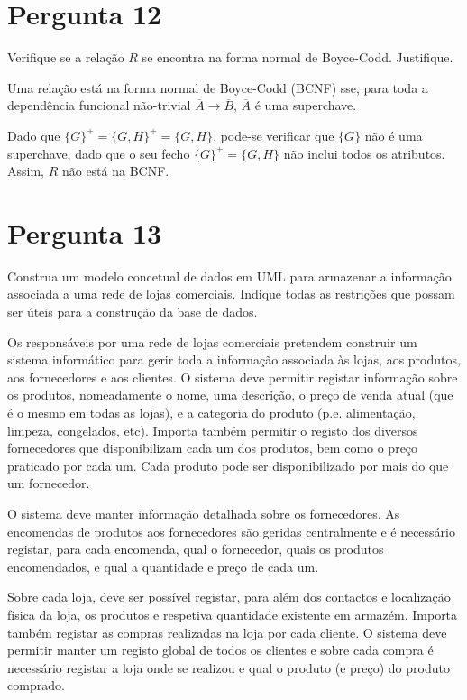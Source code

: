\documentclass[type=normal, year=2015/16]{bdad_exam}
\begin{document}
{\section{Pergunta 12}
Verifique se a relação $R$ se encontra na forma normal de Boyce-Codd. Justifique.

\ansseparator

Uma relação está na forma normal de Boyce-Codd (BCNF) sse, para toda a dependência funcional não-trivial $\overline{A} \rightarrow \overline{B}$, $\overline{A}$ é uma superchave.

Dado que $\{G\}^+=\{G,H\}^+=\{G,H\}$, pode-se verificar que $\{G\}$ não é uma superchave, dado que o seu fecho $\{G\}^+=\{G,H\}$ não inclui todos os atributos. Assim, $R$ não está na BCNF.

\section{Pergunta 13}
Construa um modelo concetual de dados em UML para armazenar a informação associada a uma rede de lojas comerciais. Indique todas as restrições que possam ser úteis para a construção da base de dados.

Os responsáveis por uma rede de lojas comerciais pretendem construir um sistema informático para gerir toda a informação associada às lojas, aos produtos, aos fornecedores e aos clientes. O sistema deve permitir registar informação sobre os produtos, nomeadamente o nome, uma descrição, o preço de venda atual (que é o mesmo em todas as lojas), e a categoria do produto (p.e. alimentação, limpeza, congelados, etc). Importa também permitir o registo dos diversos fornecedores que disponibilizam cada um dos produtos, bem como o preço praticado por cada um. Cada produto pode ser disponibilizado por mais do que um fornecedor.

O sistema deve manter informação detalhada sobre os fornecedores. As encomendas de produtos aos fornecedores são geridas centralmente e é necessário registar, para cada encomenda, qual o fornecedor, quais os produtos encomendados, e qual a quantidade e preço de cada um.

Sobre cada loja, deve ser possível registar, para além dos contactos e localização física da loja, os produtos e respetiva quantidade existente em armazém. Importa também registar as compras realizadas na loja por cada cliente. O sistema deve permitir manter um registo global de todos os clientes e sobre cada compra é necessário registar a loja onde se realizou e qual o produto (e preço) do produto comprado.

}
\end{document}
